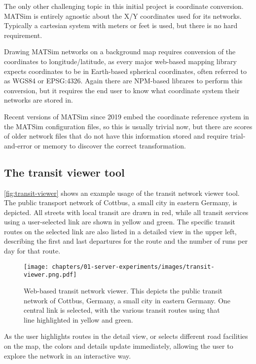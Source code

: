 The only other challenging topic in this initial project is coordinate conversion. MATSim is entirely agnostic about the X/Y coordinates used for its networks. Typically a cartesian system with meters or feet is used, but there is no hard requirement.

Drawing MATSim networks on a background map requires conversion of the coordinates to longitude/latitude, as every major web-based mapping library expects coordinates to be in Earth-based spherical coordinates, often referred to as WGS84 or EPSG:4326. Again there are NPM-based librares to perform this conversion, but it requires the end user to know what coordinate system their networks are stored in.

Recent versions of MATSim since 2019 embed the coordinate reference system in the MATSim configuration files, so this is usually trivial now, but there are scores of older network files that do not have this information stored and require trial-and-error or memory to discover the correct transformation.

\hypertarget{server-experiments-transit-result}{%
\subsection{The transit viewer tool}
\label{server-experiments-tool-transit}}

\autoref{fig:transit-viewer} shows an example usage of the transit network viewer tool. The public transport network of Cottbus, a small city in eastern Germany, is depicted. All streets with local transit are drawn in red, while all transit services using a user-selected link are shown in yellow and green. The specific transit routes on the selected link are also listed in a detailed view in the upper left, describing the first and last departures for the route and the number of runs per day for that route.

\begin{figure}[!ht]
  \texttt{[image: chapters/01-server-experiments/images/transit-viewer.png.pdf]}
  \caption{Web-based transit network viewer. This depicts the public transit network of Cottbus, Germany, a small city in eastern Germany. One central link is selected, with the various transit routes using that line highlighted in yellow and green.}
  \label{fig:transit-viewer}
  \end{figure}

As the user highlights routes in the detail view, or selects different road facilities on the map, the colors and details update immediately, allowing the user to explore the network in an interactive way.

